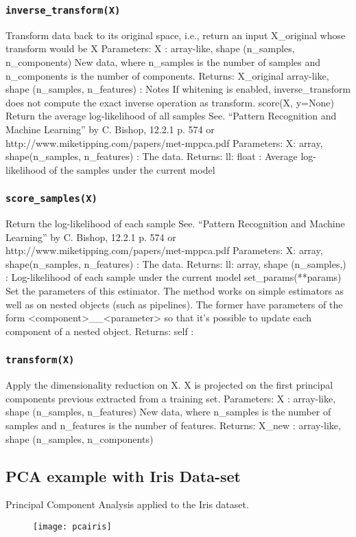 \subsubsection*{\texttt{inverse_transform(X)}}
Transform data back to its original space, i.e., return an input X_original whose transform would be X
Parameters: 
X : array-like, shape (n_samples, n_components)
New data, where n_samples is the number of samples and n_components is the number of components.
Returns: 
X_original array-like, shape (n_samples, n_features) :
Notes
If whitening is enabled, inverse_transform does not compute the exact inverse operation as transform.
score(X, y=None)
Return the average log-likelihood of all samples
See. “Pattern Recognition and Machine Learning” by C. Bishop, 12.2.1 p. 574 or http://www.miketipping.com/papers/met-mppca.pdf
Parameters: 
X: array, shape(n_samples, n_features) :
The data.
Returns: 
ll: float :
Average log-likelihood of the samples under the current model
\subsubsection*{\texttt{score_samples(X)}}
Return the log-likelihood of each sample
See. “Pattern Recognition and Machine Learning” by C. Bishop, 12.2.1 p. 574 or http://www.miketipping.com/papers/met-mppca.pdf
Parameters: 
X: array, shape(n_samples, n_features) :
The data.
Returns: 
ll: array, shape (n_samples,) :
Log-likelihood of each sample under the current model
set_params(**params)
Set the parameters of this estimator.
The method works on simple estimators as well as on nested objects (such as pipelines). The former have parameters of the form <component>__<parameter> so that it’s possible to update each component of a nested object.
Returns: self :
\subsubsection*{\texttt{transform(X)}}
Apply the dimensionality reduction on X.
X is projected on the first principal components previous extracted from a training set.
Parameters: 
X : array-like, shape (n_samples, n_features)
New data, where n_samples is the number of samples and n_features is the number of features.
Returns: 
X_new : array-like, shape (n_samples, n_components)

\newpage

\subsection*{PCA example with Iris Data-set}
Principal Component Analysis applied to the Iris dataset.
\begin{figure}
\centering
\texttt{[image: pcairis]}
\caption{}
\label{fig:pcairis}
\end{figure}

